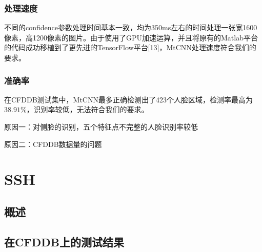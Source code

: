\subsubsection{处理速度}

不同的confidence参数处理时间基本一致，均为350ms左右的时间处理一张宽1600像素，高1200像素的图片。由于使用了GPU加速运算，并且将原有的Matlab平台的代码成功移植到了更先进的TensorFlow平台[13]，MtCNN处理速度符合我们的要求。

\subsubsection{准确率}

在CFDDB测试集中，MtCNN最多正确检测出了423个人脸区域，检测率最高为$38.91\%$，识别率较低，无法符合我们的要求。

原因一：对侧脸的识别，五个特征点不完整的人脸识别率较低

原因二：CFDDB数据量的问题


\section{SSH}

\subsection{概述}




\subsection{在CFDDB上的测试结果}

